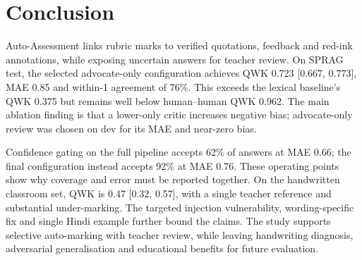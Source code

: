 \section{Conclusion}
Auto-Assessment links rubric marks to verified quotations, feedback and red-ink annotations, while exposing uncertain answers for teacher review. On SPRAG test, the selected advocate-only configuration achieves QWK 0.723 [0.667, 0.773], MAE 0.85 and within-1 agreement of 76\%. This exceeds the lexical baseline's QWK 0.375 but remains well below human--human QWK 0.962. The main ablation finding is that a lower-only critic increases negative bias; advocate-only review was chosen on dev for its MAE and near-zero bias.

Confidence gating on the full pipeline accepts 62\% of answers at MAE 0.66; the final configuration instead accepts 92\% at MAE 0.76. These operating points show why coverage and error must be reported together. On the handwritten classroom set, QWK is 0.47 [0.32, 0.57], with a single teacher reference and substantial under-marking. The targeted injection vulnerability, wording-specific fix and single Hindi example further bound the claims. The study supports selective auto-marking with teacher review, while leaving handwriting diagnosis, adversarial generalisation and educational benefits for future evaluation.
